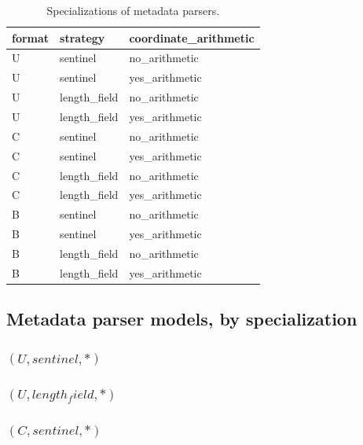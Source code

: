 \begin{table}[H]
\centering
\begin{tabular}{lll}
\toprule
 format   & strategy       & coordinate\_arithmetic   \\
\midrule
 U        & sentinel & no\_arithmetic                \\
 U        & sentinel & yes\_arithmetic                 \\
 U        & length\_field & no\_arithmetic              \\
 U        & length\_field & yes\_arithmetic             \\
 C        & sentinel & no\_arithmetic                \\
 C        & sentinel & yes\_arithmetic                 \\
 C        & length\_field & no\_arithmetic              \\
 C        & length\_field & yes\_arithmetic             \\
 B        & sentinel & no\_arithmetic                  \\
 B        & sentinel & yes\_arithmetic                 \\
 B        & length\_field & no\_arithmetic              \\
 B        & length\_field & yes\_arithmetic             \\
\bottomrule
\end{tabular}
\caption{Specializations of metadata parsers.}
\label{tab:MetadataParser_specializations}
\end{table}

\subsection{Metadata parser models, by specialization}

\subsubsection{$(U,sentinel,*)$}

\subsubsection{$(U,length_field,*)$}

\subsubsection{$(C,sentinel,*)$}

